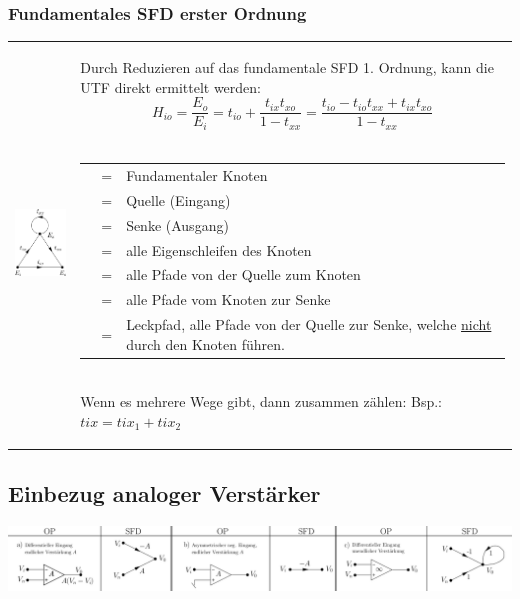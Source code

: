 \subsubsection{Fundamentales SFD erster Ordnung }
\begin{tabular}{ll}
	\parbox{7cm}{
    	\includegraphics[width=3cm]{./bilder/sfd-fundamental-erster-ordnung.png}
    }
    & \parbox{12cm}{
		Durch Reduzieren auf das fundamentale SFD 1. Ordnung, kann die UTF direkt
		ermittelt werden: \\
		\[ H_{io} = \frac{E_o}{E_i}=
		t_{io}+\frac{t_{ix}t_{xo}}{1-t_{xx}}=
		\frac{t_{io}-t_{io}t_{xx}+t_{ix}t_{xo}}{1-t_{xx}} \] \\
    \begin{tabular}{l l p{8cm}}
      $E_x$ & = & Fundamentaler Knoten\\
      $E_i$ & = & Quelle (Eingang) \\
      $E_o$ & = & Senke (Ausgang) \\
      $t_{xx}$ & = & alle Eigenschleifen des Knoten $E_x$ \\
      $t_{ix}$ & = & alle Pfade von der Quelle zum Knoten $E_x$ \\
      $t_{xo}$ & = &alle Pfade vom Knoten $E_x$ zur Senke \\
      $t_{io}$ & = & Leckpfad, alle Pfade von der Quelle zur Senke, welche \underline{nicht}
      durch den Knoten $E_x$ führen.
    \end{tabular}\\
    Wenn es mehrere Wege gibt, dann zusammen zählen: Bsp.: $tix = tix_1 +
    tix_2$
	}
\end{tabular}


\subsection{Einbezug analoger Verstärker }
\includegraphics[width=18cm]{./bilder/sfd-op.png}

